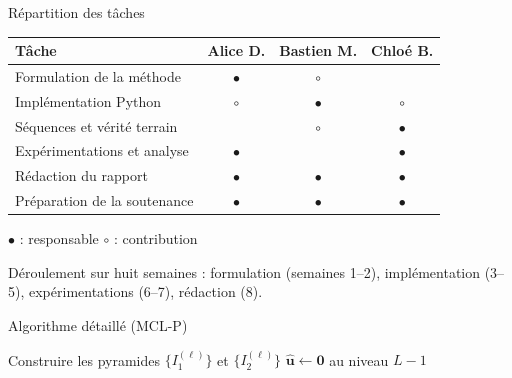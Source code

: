 \documentclass[aspectratio=169, 11pt]{beamer}
\begin{document}
\diapoquestions

\annexes

\begin{frame}{Répartition des tâches}
  \centering
  \begin{tabular}{lccc}
    \toprule
    Tâche & Alice D. & Bastien M. & Chloé B. \\
    \midrule
    Formulation de la méthode   & $\bullet$ & $\circ$   &           \\
    Implémentation Python       & $\circ$   & $\bullet$ & $\circ$   \\
    Séquences et vérité terrain &           & $\circ$   & $\bullet$ \\
    Expérimentations et analyse & $\bullet$ &           & $\bullet$ \\
    Rédaction du rapport        & $\bullet$ & $\bullet$ & $\bullet$ \\
    Préparation de la soutenance & $\bullet$ & $\bullet$ & $\bullet$ \\
    \bottomrule
  \end{tabular}

  \vspace{2mm}
  {\footnotesize $\bullet$ : responsable \quad $\circ$ : contribution\par}
  \vspace{5mm}
  \raggedright
  Déroulement sur huit semaines : formulation (semaines 1--2),
  implémentation (3--5), expérimentations (6--7), rédaction (8).
\end{frame}

\begin{frame}{Algorithme détaillé (MCL-P)}
  \begin{algorithm}[H]
    \DontPrintSemicolon
    Construire les pyramides $\{I_1^{(\ell)}\}$ et $\{I_2^{(\ell)}\}$\;
    $\hat{\bm{u}} \gets \bm{0}$ au niveau $L-1$\;
  \end{algorithm}
\end{frame}
\end{document}
